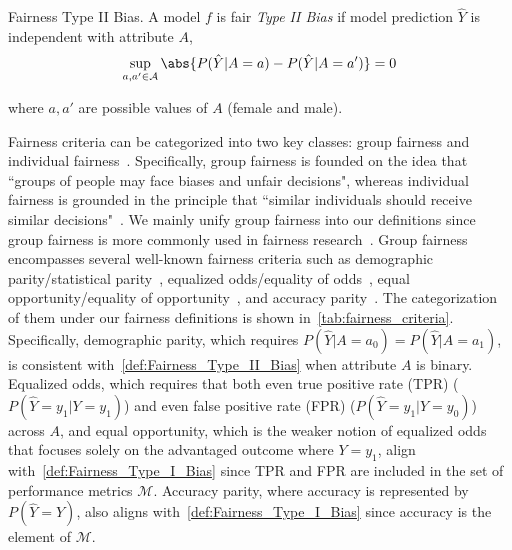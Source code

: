 \begin{definition}
    \label{def:Fairness_Type_II_Bias}
Fairness \wrt Type II Bias. A model $f$ is fair \wrt \emph{Type II Bias} if model prediction $\hat{Y}$ is independent with attribute $A$, \ie
\begin{align}
\sup_{a,a' \in \mathcal{A}} \abs{P(\hat{Y}|A=a) - P(\hat{Y}|A=a')} = 0 
\end{align}
\end{definition}
\noindent
where $a,a'$ are possible values of $A$ (\eg female and male).




Fairness criteria can be categorized into two key classes: group fairness and individual fairness~\cite{MLbias_survey, causal_based_fairness,discussion_on_DP_EO}.
Specifically, group fairness is founded on the idea that ``groups of people may face biases and unfair decisions", whereas individual fairness is grounded in the principle that ``similar individuals should receive similar decisions"~\cite{discussion_on_DP_EO}.
We mainly unify group fairness into our definitions since group fairness is more commonly used in fairness research~\cite{prediciton_quality_disparity}.
Group fairness encompasses several well-known fairness criteria such as demographic parity/statistical parity~\cite{fairness_through_awareness, counterfactual_fairness}, equalized odds/equality of odds~\cite{EO_define}, equal opportunity/equality of opportunity~\cite{EO_define}, and accuracy parity~\cite{Accuracy_parity}. The categorization of them under our fairness definitions is shown in~\cref{tab:fairness_criteria}.
Specifically, demographic parity, which requires $P(\hat{Y}|A=a_0) = P(\hat{Y}|A=a_1)$, is consistent with~\cref{def:Fairness_Type_II_Bias} when attribute $A$ is binary.
Equalized odds, which requires that both even true positive rate (TPR) ($P(\hat{Y}=y_1|Y=y_1)$) and even false positive rate (FPR) ($P(\hat{Y}=y_1|Y=y_0)$) across $A$, and equal opportunity, which is the weaker notion of equalized odds that focuses solely on the advantaged outcome where $Y=y_1$, align with~\cref{def:Fairness_Type_I_Bias} since TPR and FPR are included in the set of performance metrics $\mathcal{M}$.
Accuracy parity, where accuracy is represented by $P(\hat{Y}=Y)$, also aligns with~\cref{def:Fairness_Type_I_Bias} since accuracy is the element of $\mathcal{M}$.















